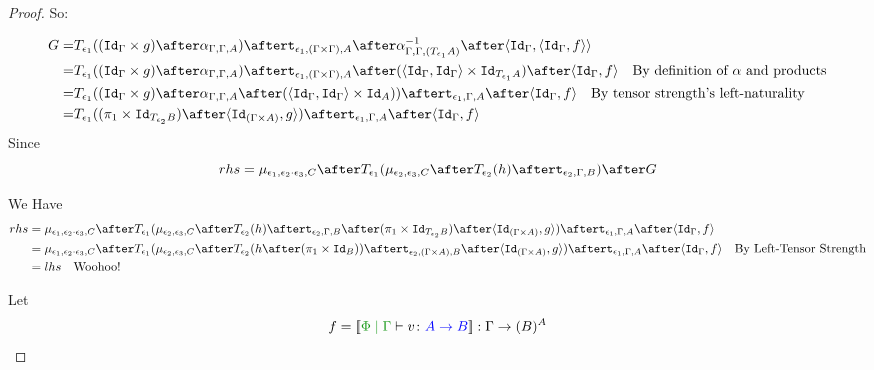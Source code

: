 \documentclass{report}
\begin{document}
\begin{framed}
\begin{proof}
        So:
        
        \begin{equation}
            \begin{split}
                G = & \T{\e_1}{((\idg\times g)\after \alpha_{\G, \G, A})} \after \tstrength{\e_1}{(\G\times\G)}{A}\after\alpha^{-1}_{\G, \G, (\T{\e_1}{A})}\after\pr{\idg}{\pr{\idg}{f}} \\
                = & \T{\e_1}{((\idg\times g)\after \alpha_{\G, \G, A})} \after \tstrength{\e_1}{(\G\times\G)}{A}\after(\pr{\idg}{\idg}\times \Id{\T{\e_1}{A}})\after\pr{\idg}{f}\qt{By definition of $\alpha$ and products}\\
                = & \T{\e_1}{((\idg\times g)\after \alpha_{\G, \G, A}\after(\pr{\idg}{\idg}\times \Id{A}))}\after\tstrength{\e_1}{\G}{A}\after\pr{\idg}{f}\qt{By tensor strength's left-naturality}\\
                = & \T{\e_1}{((\p\times\Id{\T{\e_2}{B}})\after\pr{\Id{(\G\times A)}}{g})}\after\tstrength{\e_1}{\G}{A}\after\pr{\idg}{f}
            \end{split}
        \end{equation}
        Since 
        \begin{equation}
        rhs = \bind{\e_1}{\e_2\dot\e_3}{C}\after\T{\e_1}{(\bind{\e_2}{\e_3}{C}\after \T{\e_2}{(h)} \after \tstrength{\e_2}{\G}{B})}\after G
        \end{equation}
        
        We Have
        \begin{equation}
        \begin{split}
            rhs ={} & \bind{\e_1}{\e_2\dot\e_3}{C}\after\T{\e_1}{(\bind{\e_2}{\e_3}{C}\after \T{\e_2}{(h)} \after \tstrength{\e_2}{\G}{B}\after(\p\times\Id{\T{\e_2}{B}})\after\pr{\Id{(\G\times A)}}{g})}\after\tstrength{\e_1}{\G}{A}\after\pr{\idg}{f}\\
            ={} & \bind{\e_1}{\e_2\dot\e_3}{C}\after\T{\e_1}{(\bind{\e_2}{\e_3}{C}\after \T{\e_2}{(h \after (\p\times\Id{B}))}\after\tstrength{\e_2}{(\G\times A)}{B}\after\pr{\Id{(\G\times A)}}{g})}\after\tstrength{\e_1}{\G}{A}\after\pr{\idg}{f}\qt{By Left-Tensor Strength}\\
            ={} & lhs \qt{Woohoo!}
        \end{split}
        \end{equation}
        
        
        Let 
        \begin{equation}
            f = \deno{\gpetyperelation{v}{\ab}} : \G \rightarrow (B)^{A}
        \end{equation}
        

\end{proof}
\end{framed}
\end{document}
